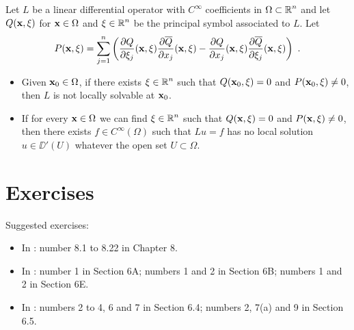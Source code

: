\begin{theorem}[Hörmander] %
Let $L$ be a linear differential operator with      \label{Hormander}
$\displaystyle C^\infty$ coefficients
in $\displaystyle \Omega \subset \mathbb{R}^n$ and let
$Q(\mathbf{x}, \mathbf{\xi})$ for $\mathbf{x} \in \Omega$ and
$\displaystyle \mathbf{\xi} \in \mathbb{R}^n$ be the principal symbol associated to $L$.
Let
\[
P(\mathbf{x},\mathbf{\xi}) = \sum_{j=1}^n \left(
\frac{\partial{Q}}{\partial \xi_j}(\mathbf{x},\mathbf{\xi})
\frac{\partial{\overline{Q}}}{\partial x_j}(\mathbf{x},\mathbf{\xi})
- \frac{\partial{Q}}{\partial x_j}(\mathbf{x},\mathbf{\xi})
\frac{\partial{\overline{Q}}}{\partial \xi_j}(\mathbf{x},\mathbf{\xi}) \right) \ .
\]
\begin{itemize}
\item Given $\mathbf{x}_0 \in \Omega$, if there exists
$\displaystyle \mathbf{\xi} \in \mathbb{R}^n$ such that
$Q(\mathbf{x}_0,\mathbf{\xi})=0$ and $P(\mathbf{x}_0,\mathbf{\xi})\neq 0$, then
$L$ is not locally solvable at $\mathbf{x}_0$.
\item If for every $\mathbf{x} \in \Omega$ we can find
$\displaystyle \mathbf{\xi} \in \mathbb{R}^n$
such that $Q(\mathbf{x},\mathbf{\xi})=0$ and $P(\mathbf{x},\mathbf{\xi})\neq 0$,
then there exists $\displaystyle f \in C^\infty(\Omega)$ such that
$Lu = f$ has no 
local solution $u \in \DD'(U)$ whatever the open set $U \subset \Omega$.
\end{itemize}
\end{theorem}

\section{Exercises}

Suggested exercises:

\begin{itemize}
\item In \cite{Br}: number 8.1 to 8.22 in Chapter 8.
\item In \cite{FoPDE}: number 1 in Section 6A; numbers 1 and 2 in
Section 6B; numbers 1 and 2 in Section 6E.
\item In \cite{McO}: numbers 2 to 4, 6 and 7 in Section 6.4;
numbers 2, 7(a) and 9 in Section 6.5. 
\end{itemize}

